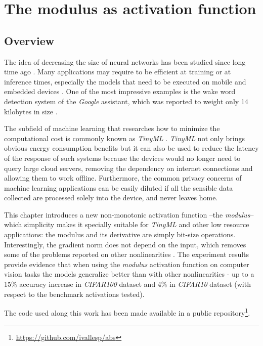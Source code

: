 \chapter{The modulus as activation function} \label{ch:modulus}

\section{Overview}
The idea of decreasing the size of neural networks has been studied since long time ago \autocite{lecun1989, hassibi1993, frankleC19}. Many applications may require to be efficient at training or at inference times, especially the models that need to be executed on mobile and embedded devices \autocite{ooko2021, zapico2021}. One of the most impressive examples is the wake word detection system of the \textit{Google} assistant, which was reported to weight only 14 kilobytes in size \autocite{warden2020}. 

The subfield of machine learning that researches how to minimize the computational cost is commonly known as \textit{TinyML} \autocite{han2022}. \textit{TinyML} not only brings obvious energy consumption benefits but it can also be used to reduce the latency of the response of such systems because the devices would no longer need to query large cloud servers, removing the dependency on internet connections and allowing them to work offline. Furthermore, the common privacy concerns of machine learning applications \autocite{ha2019} can be easily diluted if all the sensible data collected are processed solely into the device, and never leaves home.

This chapter introduces a new non-monotonic activation function --the \textit{modulus}-- which simplicity makes it specially suitable for \textit{TinyML} and other low resource applications: the modulus and its derivative are simply bit-size operations. Interestingly, the gradient norm does not depend on the input, which removes some of the problems reported on other nonlinearities \autocite{lu2020, pascanu13, hochreiter1998, Hochreiter2001}. The experiment results provide evidence that when using the \textit{modulus} activation function on computer vision tasks the models generalize better than with other nonlinearities - up to a 15\% accuracy increase in \textit{CIFAR100} dataset and 4\% in \textit{CIFAR10} dataset (with respect to the benchmark activations tested). 



The code used along this work has been made available in a public repository\footnote{\url{https://github.com/ivallesp/abs}}.


